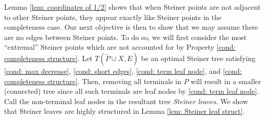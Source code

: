 \documentclass{article}\providecommand{\DeclareRedundantLanguages}[2]{}\usepackage[a4paper,margin=20mm]{geometry}
\newcommand{\1}{\textbf{1}}
\renewcommand{\tilde}{\widetilde}
\begin{document}
Lemma \ref{lem: coordinates of 1/2} shows that when Steiner points are not adjacent to other Steiner points, they appear exactly like Steiner points in the completeness case. Our next objective is then to show that we may assume there are no edges between Steiner points. To do so, we will first consider the most ``extremal'' Steiner points which are not accounted for by Property \ref{cond: completeness structure}. Let $T(\tilde{P} \cup X, E)$ be an optimal Steiner tree satisfying \ref{cond: max decrease}, \ref{cond: short edges}, \ref{cond: term leaf node}, and \ref{cond: completeness structure}. Then, removing all terminals in $P$ will result in a smaller (connected) tree since all such terminals are leaf nodes by \ref{cond: term leaf node}. Call the non-terminal leaf nodes in the resultant tree \textit{Steiner leaves}. We show that Steiner leaves are highly structured in Lemma \ref{lem: Steiner leaf struct}.
\end{document}
